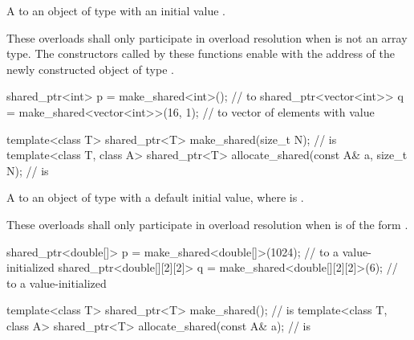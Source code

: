 \begin{itemdescr}
\pnum
\returns A  to an object of type 
with an initial value .

\pnum
\remarks These overloads shall only participate in overload resolution
when  is not an array type.
The  constructors called by these functions
enable 
with the address of the newly constructed object of type .

\pnum
\begin{example}
\begin{codeblock}
shared_ptr<int> p = make_shared<int>(); //  to 
shared_ptr<vector<int>> q = make_shared<vector<int>>(16, 1);
  //  to vector of  elements with value 
\end{codeblock}
\end{example}
\end{itemdescr}

%
%
\begin{itemdecl}
template<class T> shared_ptr<T>
  make_shared(size_t N);                                        //  is 
template<class T, class A>
  shared_ptr<T> allocate_shared(const A& a, size_t N);          //  is 
\end{itemdecl}

\begin{itemdescr}
\pnum
\returns A  to an object of type 
with a default initial value,
where  is .

\pnum
\remarks These overloads shall only participate in overload resolution
when  is of the form .

\pnum
\begin{example}
\begin{codeblock}
shared_ptr<double[]> p = make_shared<double[]>(1024);
  //  to a value-initialized 
shared_ptr<double[][2][2]> q = make_shared<double[][2][2]>(6);
  //  to a value-initialized 
\end{codeblock}
\end{example}
\end{itemdescr}

%
%
\begin{itemdecl}
template<class T>
  shared_ptr<T> make_shared();                                  //  is 
template<class T, class A>
  shared_ptr<T> allocate_shared(const A& a);                    //  is 
\end{itemdecl}

